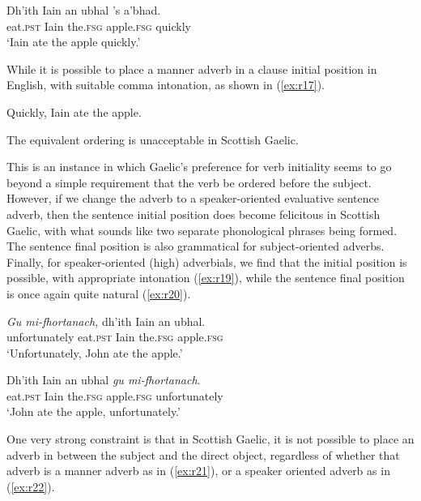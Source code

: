 \documentclass[output=paper,colorlinks,citecolor=brown]{langscibook}
\begin{document}
\ea\label{ex:r16}
\gll Dh'ith	Iain  an	ubhal	{'s 		a'bhad.}  \\
eat.\textsc{pst}   Iain  the.\textsc{fsg}	 apple.\textsc{fsg}  quickly \\
\glt `Iain ate the apple quickly.'
\z

While it is possible to place a manner adverb in a clause initial position in English, with suitable comma intonation, as shown in (\ref{ex:r17}). 

\ea\label{ex:r17} Quickly, Iain ate the apple.
\z

\noindent The equivalent ordering is unacceptable in Scottish Gaelic.

\ea\label{ex:r18}
\z
\z

This is an instance in which Gaelic's preference for verb initiality seems to go beyond a simple requirement that the verb be ordered before the subject. However, if we change the adverb to a speaker\hyp oriented evaluative sentence adverb, then the sentence initial position does become felicitous in Scottish Gaelic, with what sounds like two separate phonological phrases being formed.  The sentence final position is also grammatical for subject-oriented adverbs. 
Finally, for speaker\hyp oriented (high) adverbials, we find that the initial position is possible, with appropriate intonation (\ref{ex:r19}), while the sentence final position is once again quite natural (\ref{ex:r20}). 

\ea\label{ex:r19}
\gll \textit{Gu	mi-fhortanach,} dh'ith	Iain	 an	ubhal. \\
unfortunately eat.\textsc{pst}	Iain	 the.\textsc{fsg}	apple.\textsc{fsg} \\
\glt `Unfortunately, John ate the apple.'
\z

\ea\label{ex:r20}
\gll Dh'ith	Iain	 an	ubhal \textit{gu	mi-fhortanach}. \\
eat.\textsc{pst}	Iain	 the.\textsc{fsg}	apple.\textsc{fsg}	 unfortunately \\
\glt `John ate the apple, unfortunately.'
\z

One very strong constraint is that in Scottish Gaelic, it is not possible to place an adverb in between the subject and the direct object, regardless of whether that adverb is a manner adverb as in (\ref{ex:r21}), or a speaker oriented adverb as in (\ref{ex:r22}). 

\z
\end{document}
